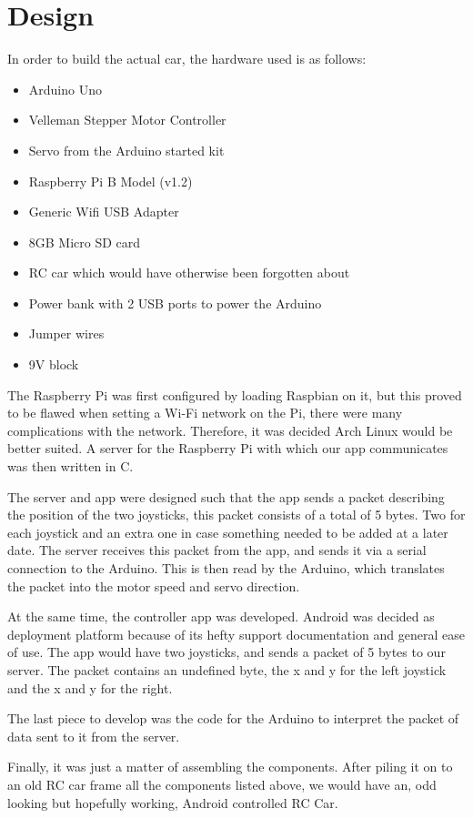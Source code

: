 \section{Design}
\par
In order to build the actual car, the hardware used is as follows:
\begin{itemize}
\item Arduino Uno
\item Velleman Stepper Motor Controller
\item Servo from the Arduino started kit
\item Raspberry Pi B Model (v1.2)
\item Generic Wifi USB Adapter
\item 8GB Micro SD card
\item RC car which would have otherwise been forgotten about
\item Power bank with 2 USB ports to power the Arduino
\item Jumper wires
\item 9V block
\end{itemize}
The Raspberry Pi was first configured by loading Raspbian on it, but this proved to be flawed when setting a Wi-Fi network on the Pi, there were many complications with the network. Therefore, it was decided Arch Linux would be better suited. A server for the Raspberry Pi with which our app communicates was then written in C.

The server and app were designed such that the app sends a packet describing the position of the two joysticks, this packet consists of a total of 5 bytes. Two for each joystick and an extra one in case something needed to be added at a later date. The server receives this packet from the app, and sends it via a serial connection to the Arduino. This is then read by the Arduino, which translates the packet into the motor speed and servo direction.

At the same time, the controller app was developed. Android was decided as deployment platform because of its hefty support documentation and general ease of use. The app would have two joysticks, and sends a packet of 5 bytes to our server. The packet contains an undefined byte, the x and y for the left joystick and the x and y for the right.

The last piece to develop was the code for the Arduino to interpret the packet of data sent to it from the server.

Finally, it was just a matter of assembling the components. After piling it on to an old RC car frame all the components listed above, we would have an, odd looking but hopefully working, Android controlled RC Car.
